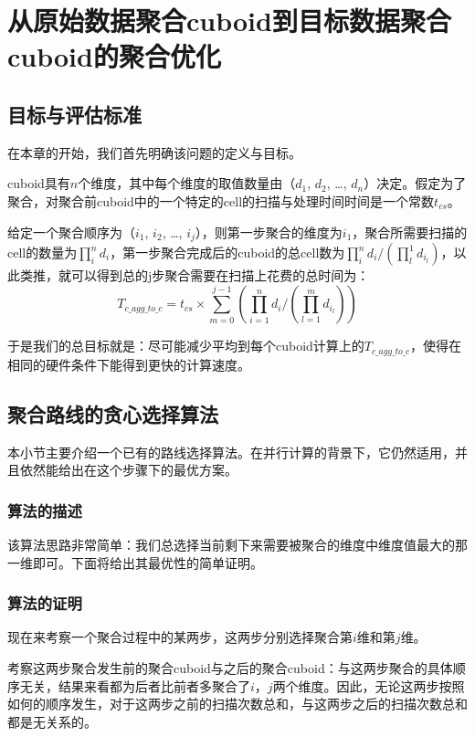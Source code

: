\chapter{从原始数据聚合cuboid到目标数据聚合cuboid的聚合优化}
\section{目标与评估标准}
在本章的开始，我们首先明确该问题的定义与目标。

cuboid具有$n$个维度，其中每个维度的取值数量由（$d_1$, $d_2$, …, $d_n$）决定。假定为了聚合，对聚合前cuboid中的一个特定的cell的扫描与处理时间时间是一个常数$t_{cs}$。

给定一个聚合顺序为（$i_1$, $i_2$, …, $i_j$），则第一步聚合的维度为$i_1$，聚合所需要扫描的cell的数量为$\prod_{i}^{n} d_i$，第一步聚合完成后的cuboid的总cell数为$\prod_{i}^{n} d_i / (\prod_{l}^{1} d_{i_l})$，以此类推，就可以得到总的j步聚合需要在扫描上花费的总时间为：
\begin{equation}
T_{c\_agg\_to\_c} = t_{cs} \times \sum_{m = 0}^{j - 1} (\prod_{i = 1}^{n} d_i / (\prod_{l = 1}^{m} d_{i_l}))
\end{equation}

于是我们的总目标就是：尽可能减少平均到每个cuboid计算上的$T_{c\_agg\_to\_c}$，使得在相同的硬件条件下能得到更快的计算速度。

\section{聚合路线的贪心选择算法}
本小节主要介绍一个已有的路线选择算法。在并行计算的背景下，它仍然适用，并且依然能给出在这个步骤下的最优方案。

\subsection{算法的描述}
该算法思路非常简单：我们总选择当前剩下来需要被聚合的维度中维度值最大的那一维即可。下面将给出其最优性的简单证明。

\subsection{算法的证明}
现在来考察一个聚合过程中的某两步，这两步分别选择聚合第$i$维和第$j$维。

考察这两步聚合发生前的聚合cuboid与之后的聚合cuboid：与这两步聚合的具体顺序无关，结果来看都为后者比前者多聚合了$i$，$j$两个维度。因此，无论这两步按照如何的顺序发生，对于这两步之前的扫描次数总和，与这两步之后的扫描次数总和都是无关系的。


